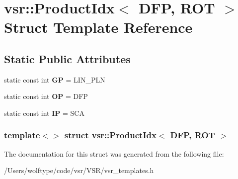 \hypertarget{structvsr_1_1_product_idx_3_01_d_f_p_00_01_r_o_t_01_4}{\section{vsr\-:\-:Product\-Idx$<$ D\-F\-P, R\-O\-T $>$ Struct Template Reference}
\label{structvsr_1_1_product_idx_3_01_d_f_p_00_01_r_o_t_01_4}
}
\subsection*{Static Public Attributes}
\begin{DoxyCompactItemize}
\item 
\hypertarget{structvsr_1_1_product_idx_3_01_d_f_p_00_01_r_o_t_01_4_a9fe960cad1f9eaf904e989de135ee4d1}{static const int {\bfseries G\-P} = L\-I\-N\-\_\-\-P\-L\-N}\label{structvsr_1_1_product_idx_3_01_d_f_p_00_01_r_o_t_01_4_a9fe960cad1f9eaf904e989de135ee4d1}

\item 
\hypertarget{structvsr_1_1_product_idx_3_01_d_f_p_00_01_r_o_t_01_4_a24cd111c9718872725eb6675afa45564}{static const int {\bfseries O\-P} = D\-F\-P}\label{structvsr_1_1_product_idx_3_01_d_f_p_00_01_r_o_t_01_4_a24cd111c9718872725eb6675afa45564}

\item 
\hypertarget{structvsr_1_1_product_idx_3_01_d_f_p_00_01_r_o_t_01_4_a2f8d11bd7bad1bd0b8918b7efd0818f4}{static const int {\bfseries I\-P} = S\-C\-A}\label{structvsr_1_1_product_idx_3_01_d_f_p_00_01_r_o_t_01_4_a2f8d11bd7bad1bd0b8918b7efd0818f4}

\end{DoxyCompactItemize}
\subsubsection*{template$<$$>$ struct vsr\-::\-Product\-Idx$<$ D\-F\-P, R\-O\-T $>$}



The documentation for this struct was generated from the following file\-:\begin{DoxyCompactItemize}
\item 
/\-Users/wolftype/code/vsr/\-V\-S\-R/vsr\-\_\-templates.\-h\end{DoxyCompactItemize}
